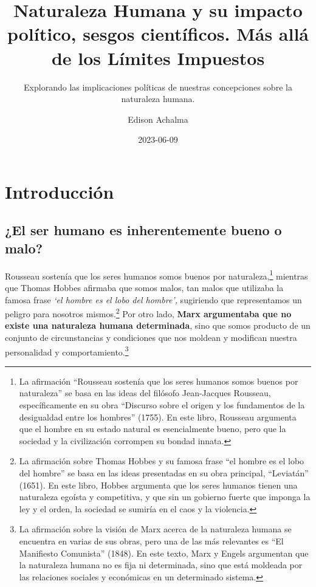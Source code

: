 \documentclass[
  letterpaper,
  DIV=11,
  numbers=noendperiod]{scrartcl}
\title{Naturaleza Humana y su impacto político, sesgos científicos. Más
allá de los Límites Impuestos}
\subtitle{Explorando las implicaciones políticas de nuestras
concepciones sobre la naturaleza humana.}
\author{Edison Achalma}
\date{2023-06-09}
\begin{document}
\maketitle
\ifdefined\Shaded\renewenvironment{Shaded}{\begin{tcolorbox}[frame hidden, borderline west={3pt}{0pt}{shadecolor}, boxrule=0pt, interior hidden, breakable, sharp corners, enhanced]}{\end{tcolorbox}}\fi

\hypertarget{introducciuxf3n}{%
\section{Introducción}\label{introducciuxf3n}}

\hypertarget{el-ser-humano-es-inherentemente-bueno-o-malo}{%
\subsection{¿El ser humano es inherentemente bueno o
malo?}\label{el-ser-humano-es-inherentemente-bueno-o-malo}}

Rousseau sostenía que los seres humanos somos buenos por
naturaleza,\footnote{La afirmación ``Rousseau sostenía que los seres
  humanos somos buenos por naturaleza'' se basa en las ideas del
  filósofo Jean-Jacques Rousseau, específicamente en su obra ``Discurso
  sobre el origen y los fundamentos de la desigualdad entre los
  hombres'' (1755). En este libro, Rousseau argumenta que el hombre en
  su estado natural es esencialmente bueno, pero que la sociedad y la
  civilización corrompen su bondad innata.} mientras que Thomas Hobbes
afirmaba que somos malos, tan malos que utilizaba la famosa frase
\emph{`el hombre es el lobo del hombre',} sugiriendo que representamos
un peligro para nosotros mismos.\footnote{La afirmación sobre Thomas
  Hobbes y su famosa frase ``el hombre es el lobo del hombre'' se basa
  en las ideas presentadas en su obra principal, ``Leviatán'' (1651). En
  este libro, Hobbes argumenta que los seres humanos tienen una
  naturaleza egoísta y competitiva, y que sin un gobierno fuerte que
  imponga la ley y el orden, la sociedad se sumiría en el caos y la
  violencia.} Por otro lado, \textbf{Marx argumentaba que no existe una
naturaleza humana determinada}, sino que somos producto de un conjunto
de circunstancias y condiciones que nos moldean y modifican nuestra
personalidad y comportamiento.\footnote{La afirmación sobre la visión de
  Marx acerca de la naturaleza humana se encuentra en varias de sus
  obras, pero una de las más relevantes es ``El Manifiesto Comunista''
  (1848). En este texto, Marx y Engels argumentan que la naturaleza
  humana no es fija ni determinada, sino que está moldeada por las
  relaciones sociales y económicas en un determinado sistema.}
\end{document}
